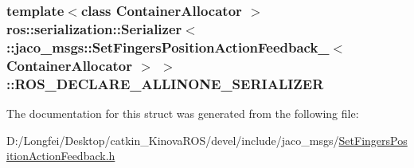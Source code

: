 \subsubsection[{\texorpdfstring{R\+O\+S\+\_\+\+D\+E\+C\+L\+A\+R\+E\+\_\+\+A\+L\+L\+I\+N\+O\+N\+E\+\_\+\+S\+E\+R\+I\+A\+L\+I\+Z\+ER}{ROS_DECLARE_ALLINONE_SERIALIZER}}]{\setlength{\rightskip}{0pt plus 5cm}template$<$class Container\+Allocator $>$ ros\+::serialization\+::\+Serializer$<$ \+::{\bf jaco\+\_\+msgs\+::\+Set\+Fingers\+Position\+Action\+Feedback\+\_\+}$<$ Container\+Allocator $>$ $>$\+::R\+O\+S\+\_\+\+D\+E\+C\+L\+A\+R\+E\+\_\+\+A\+L\+L\+I\+N\+O\+N\+E\+\_\+\+S\+E\+R\+I\+A\+L\+I\+Z\+ER}\hypertarget{structros_1_1serialization_1_1Serializer_3_01_1_1jaco__msgs_1_1SetFingersPositionActionFeedback_447d288d4cb72b1c92e396d90d0558f7_ac7b4599dc9263e0953735789c599377f}{}\label{structros_1_1serialization_1_1Serializer_3_01_1_1jaco__msgs_1_1SetFingersPositionActionFeedback_447d288d4cb72b1c92e396d90d0558f7_ac7b4599dc9263e0953735789c599377f}


The documentation for this struct was generated from the following file\+:\begin{DoxyCompactItemize}
\item 
D\+:/\+Longfei/\+Desktop/catkin\+\_\+\+Kinova\+R\+O\+S/devel/include/jaco\+\_\+msgs/\hyperlink{SetFingersPositionActionFeedback_8h}{Set\+Fingers\+Position\+Action\+Feedback.\+h}\end{DoxyCompactItemize}
